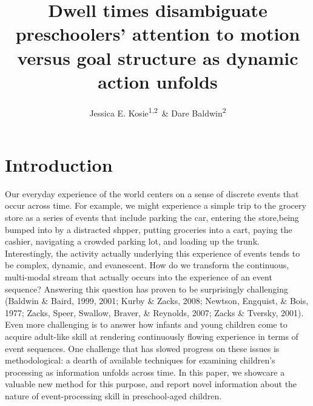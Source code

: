 \documentclass[
  english,
  man,floatsintext]{apa6}
\author{Jessica E. Kosie\textsuperscript{1,2}\ \& Dare Baldwin\textsuperscript{2}}
\affiliation{
\vspace{0.5cm}
\textsuperscript{1} Department of Psychology, Princeton University\\\textsuperscript{2} Department of Psychology, University of Oregon}
\title{Dwell times disambiguate preschoolers' attention to motion versus goal structure as dynamic action unfolds}
\date{}
\begin{document}
\maketitle

\hypertarget{introduction}{%
\section{Introduction}\label{introduction}}

Our everyday experience of the world centers on a sense of discrete events that occur across time. For example, we might experience a simple trip to the grocery store as a series of events that include parking the car, entering the store,being bumped into by a distracted shpper, putting groceries into a cart, paying the cashier, navigating a crowded parking lot, and loading up the trunk. Interestingly, the activity actually underlying this experience of events tends to be complex, dynamic, and evanescent. How do we transform the continuous, multi-modal stream that actually occurs into the experience of an event sequence? Answering this question has proven to be surprisingly challenging (Baldwin \& Baird, 1999, 2001; Kurby \& Zacks, 2008; Newtson, Engquist, \& Bois, 1977; Zacks, Speer, Swallow, Braver, \& Reynolds, 2007; Zacks \& Tversky, 2001). Even more challenging is to answer how infants and young children come to acquire adult-like skill at rendering continuously flowing experience in terms of event sequences. One challenge that has slowed progress on these issues is methodological: a dearth of available techniques for examining children's processing as information unfolds across time. In this paper, we showcare a valuable new method for this purpose, and report novel information about the nature of event-processing skill in preschool-aged children.
\end{document}
